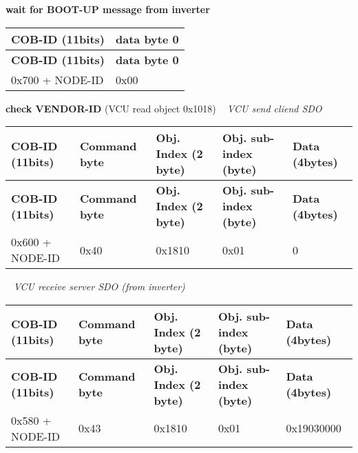 \begin{DoxyEnumerate}
\item {\bfseries wait for B\+O\+O\+T-\/\+UP message from inverter} ~\newline
 \tabulinesep=1mm
\begin{longtabu} spread 0pt [c]{*{2}{|X[-1]}|}
\hline
\rowcolor{\tableheadbgcolor}\textbf{ C\+O\+B-\/\+ID (11bits)  }&\textbf{ data byte 0   }\\
\endfirsthead
\hline
\endfoot
\hline
\rowcolor{\tableheadbgcolor}\textbf{ C\+O\+B-\/\+ID (11bits)  }&\textbf{ data byte 0   }\\
\endhead
0x700 + N\+O\+D\+E-\/\+ID  &0x00   \\
\end{longtabu}



\item {\bfseries check V\+E\+N\+D\+O\+R-\/\+ID} (V\+CU read object 0x1018) ~\newline
 {\itshape V\+CU send cliend S\+DO} \tabulinesep=1mm
\begin{longtabu} spread 0pt [c]{*{5}{|X[-1]}|}
\hline
\rowcolor{\tableheadbgcolor}\textbf{ C\+O\+B-\/\+ID (11bits)  }&\textbf{ Command byte  }&\textbf{ Obj. Index (2 byte)  }&\textbf{ Obj. sub-\/index (byte)  }&\textbf{ Data (4bytes)   }\\
\endfirsthead
\hline
\endfoot
\hline
\rowcolor{\tableheadbgcolor}\textbf{ C\+O\+B-\/\+ID (11bits)  }&\textbf{ Command byte  }&\textbf{ Obj. Index (2 byte)  }&\textbf{ Obj. sub-\/index (byte)  }&\textbf{ Data (4bytes)   }\\
\endhead
0x600 + N\+O\+D\+E-\/\+ID  &0x40  &0x1810  &0x01  &0   \\
\end{longtabu}
~\newline
 {\itshape V\+CU receive server S\+DO (from inverter)} \tabulinesep=1mm
\begin{longtabu} spread 0pt [c]{*{5}{|X[-1]}|}
\hline
\rowcolor{\tableheadbgcolor}\textbf{ C\+O\+B-\/\+ID (11bits)  }&\textbf{ Command byte  }&\textbf{ Obj. Index (2 byte)  }&\textbf{ Obj. sub-\/index (byte)  }&\textbf{ Data (4bytes)   }\\
\endfirsthead
\hline
\endfoot
\hline
\rowcolor{\tableheadbgcolor}\textbf{ C\+O\+B-\/\+ID (11bits)  }&\textbf{ Command byte  }&\textbf{ Obj. Index (2 byte)  }&\textbf{ Obj. sub-\/index (byte)  }&\textbf{ Data (4bytes)   }\\
\endhead
0x580 + N\+O\+D\+E-\/\+ID  &0x43  &0x1810  &0x01  &0x19030000   \\
\end{longtabu}




\end{DoxyEnumerate}
